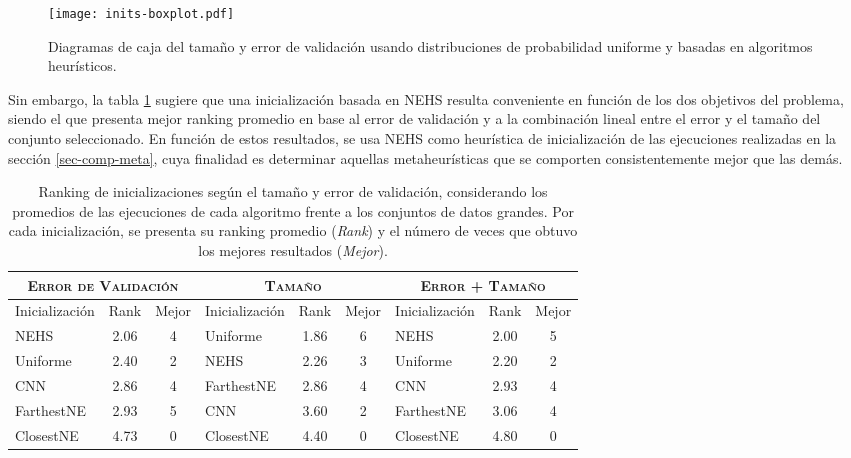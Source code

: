 \begin{figure}[h!]
\centering
\texttt{[image: inits-boxplot.pdf]}
\caption[Tamaño y error de validación usando algoritmos heurísticos]{Diagramas de caja del tamaño y error de validación usando distribuciones de probabilidad uniforme y basadas en algoritmos heurísticos.}
\label{fig-inits}
\end{figure}

Sin embargo, la tabla \ref{table-inits-rank} sugiere que una inicialización basada en NEHS resulta conveniente en función de los dos objetivos del problema, siendo el que presenta mejor ranking promedio en base al error de validación y a la combinación lineal entre el error y el tamaño del conjunto seleccionado. En función de estos resultados, se usa NEHS como heurística de inicialización de las ejecuciones realizadas en la sección \ref{sec-comp-meta}, cuya finalidad es determinar aquellas metaheurísticas que se comporten consistentemente mejor que las demás.

\begin{table}[h!]
\centering
\begin{tabular}{l c c|l c c|l c c}
\hline
\multicolumn{3}{c|}{\textsc{Error de Validación}}
	& \multicolumn{3}{c|}{\textsc{Tamaño}}
	& \multicolumn{3}{c}{\textsc{Error + Tamaño}} \\
\hline
Inicialización & Rank & Mejor & Inicialización & Rank & Mejor & Inicialización & Rank & Mejor \\
\hline
\hline
NEHS       & 2.06 & 4 & Uniforme   & 1.86 & 6 & NEHS       & 2.00 & 5 \\
Uniforme   & 2.40 & 2 & NEHS       & 2.26 & 3 & Uniforme   & 2.20 & 2 \\
CNN        & 2.86 & 4 & FarthestNE & 2.86 & 4 & CNN        & 2.93 & 4 \\
FarthestNE & 2.93 & 5 & CNN        & 3.60 & 2 & FarthestNE & 3.06 & 4 \\
ClosestNE  & 4.73 & 0 & ClosestNE  & 4.40 & 0 & ClosestNE  & 4.80 & 0 \\
\hline
\end{tabular}
\caption[Ranking de inicializaciones según el tamaño y error de validación]{Ranking de inicializaciones según el tamaño y error de validación, considerando los promedios de las ejecuciones de cada algoritmo frente a los conjuntos de datos grandes. Por cada inicialización, se presenta su ranking promedio (\emph{Rank}) y el número de veces que obtuvo los mejores resultados (\emph{Mejor}).}
\label{table-inits-rank}
\end{table} 

